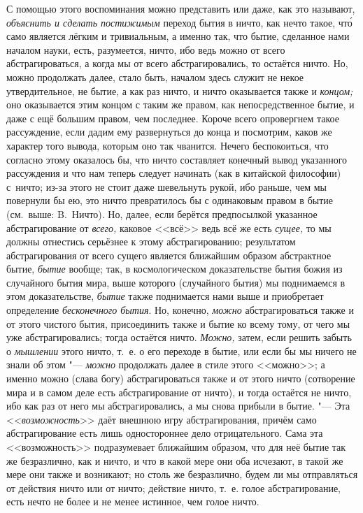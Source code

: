 С помощью этого воспоминания можно представить или даже, как это называют,
{\em объяснить и сделать постижимым} переход бытия в ничто, как нечто такое,
чт\'{о} само является лёгким и тривиальным, а именно так, что бытие, сделанное
нами началом науки, есть, разумеется, ничто, ибо ведь можно от всего
абстрагироваться, а когда мы от всего абстрагировались, то остаётся ничто. Но,
можно продолжать далее, стало быть, началом здесь служит не некое
утвердительное, не бытие, а как раз ничто, и ничто оказывается также и
{\em концом;} оно оказывается этим концом с таким же правом, как
непосредственное бытие, и даже с ещё большим правом, чем последнее. Короче
всего опровергнем такое рассуждение, если дадим ему развернуться до конца и
посмотрим, каков же характер того вывода, которым оно так чванится. Нечего
беспокоиться, что согласно этому оказалось бы, что ничто составляет конечный
вывод указанного рассуждения и что нам теперь следует начинать (как в китайской
философии) с~ничто; из-за этого не стоит даже шевельнуть рукой, ибо раньше, чем
мы повернули бы ею, это ничто превратилось бы с одинаковым правом в бытие
(см.~выше: B.~Ничто). Но, далее, если берётся предпосылкой указанное
абстрагирование от {\em всего,} каковое <<всё>> ведь всё же есть {\em сущее,}
то мы должны отнестись серьёзнее к этому абстрагированию; результатом
абстрагирования от всего сущего является ближайшим образом абстрактное бытие,
{\em бытие} вообще; так, в космологическом доказательстве бытия божия из
случайного бытия мира, выше которого (случайного бытия) мы поднимаемся в этом
доказательстве, {\em бытие} также поднимается нами выше и приобретает
определение {\em бесконечного бытия}. Но, конечно, {\em можно} абстрагироваться
также и от этого чистого бытия, присоединить также и бытие ко всему тому, от
чего мы уже абстрагировались; тогда остаётся ничто. {\em Можно,} затем, если
решить забыть о {\em мышлении} этого ничто, т.~е. о его переходе в бытие, или
если бы мы ничего не знали об этом "--- {\em можно} продолжать далее в стиле
этого <<можно>>; а именно можно (слава богу) абстрагироваться также и от этого
ничто (сотворение мира и в самом деле есть абстрагирование от ничто), и тогда
остаётся не ничто, ибо как раз от него мы абстрагировались, а мы снова прибыли
в бытие. "--- Эта <<{\em возможность}>> даёт внешнюю игру абстрагирования,
причём само абстрагирование есть лишь одностороннее дело отрицательного. Сама
эта <<возможность>> подразумевает ближайшим образом, что для неё бытие так же
безразлично, как и ничто, и что в какой мере они оба исчезают, в такой же мере
они также и возникают; но столь же безразлично, будем ли мы отправляться от
действия ничто или от ничто; действие ничто, т.~е. голое абстрагирование, есть
нечто не более и не менее истинное, чем голое ничто.

